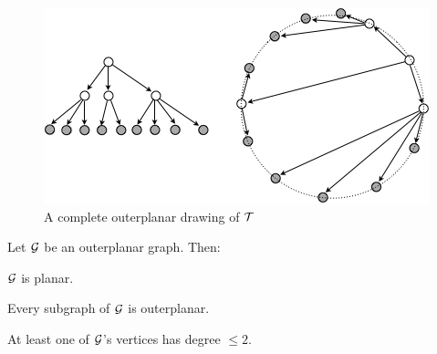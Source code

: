 \begin{figure}[hbt]
\begin{center}
       \includegraphics[scale=0.45]{FiguresGraph/TreeOutplanar3}
       \caption{A complete outerplanar drawing of $\mbox{$\cal T$}$}
  \label{fig:treeoutplanar3}
\end{center}
\end{figure}

\begin{prop}
\label{thm:basic-outerplanar-stuff}
Let $\mbox{$\cal G$}$ be an outerplanar graph.  Then:

\smallskip

$\mbox{$\cal G$}$ is planar.


\smallskip

Every subgraph of $\mbox{$\cal G$}$ is outerplanar.

\smallskip

At least one of $\mbox{$\cal G$}$'s vertices has degree $\leq 2$.
\end{prop}

